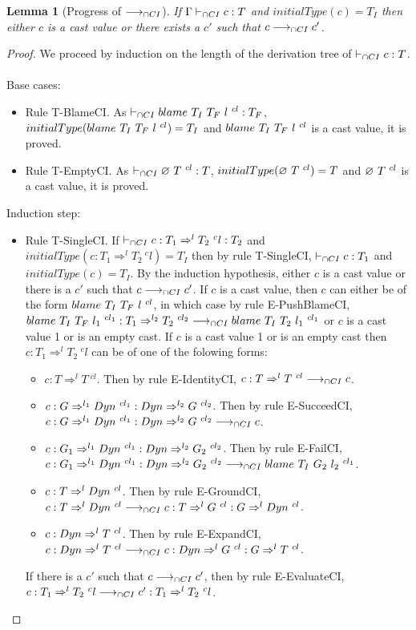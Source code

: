 \documentclass[a4paper]{article}
\newtheorem{lemma}{Lemma}[section]
\begin{document}
\begin{lemma}[Progress of $\longrightarrow_{\cap CI}$]
\label{progressIC}
If $\Gamma \vdash_{\cap CI} c : T$ and $initialType(c) = T_I$ then either $c$ is a cast value or there exists a $c'$ such that $c \longrightarrow_{\cap CI} c'$.
\end{lemma}
\begin{proof}
We proceed by induction on the length of the derivation tree of $\vdash_{\cap CI} c : T$.\\\\
Base cases:
\begin{itemize}
    \item Rule T-BlameCI.
    As $\vdash_{\cap CI} blame\ T_I\ T_F\ l\ ^{cl} : T_F$, $initialType(blame\ T_I\ T_F\ l\ ^{cl}) = T_I$ and $blame\ T_I\ T_F\ l\ ^{cl}$ is a cast value, it is proved.
    \item Rule T-EmptyCI.
    As $\vdash_{\cap CI} \varnothing\ T\ ^{cl} : T$, $initialType(\varnothing\ T\ ^{cl}) = T$ and $\varnothing\ T\ ^{cl}$ is a cast value, it is proved.
\end{itemize}
Induction step:
\begin{itemize}
    \item Rule T-SingleCI.
    If $\vdash_{\cap CI} c : T_1 \Rightarrow^l T_2\ ^cl : T_2$ and $initialType(c : T_1 \Rightarrow^l T_2\ ^cl) = T_I$ then by rule T-SingleCI, $\vdash_{\cap CI} c : T_1$ and $initialType(c) = T_I$.
    By the induction hypothesis, either $c$ is a cast value or there is a $c'$ such that $c \longrightarrow_{\cap CI} c'$.
    If $c$ is a cast value, then $c$ can either be of the form $blame\ T_I\ T_F\ l\ ^{cl}$, in which case by rule E-PushBlameCI, $blame\ T_I\ T_F\ l_1\ ^{cl_1} : T_1 \Rightarrow^{l_2} T_2\ ^{cl_2} \longrightarrow_{\cap CI} blame\ T_I\ T_2\ l_1\ ^{cl_1}$ or $c$ is a cast value 1 or is an empty cast.
    If $c$ is a cast value 1 or is an empty cast then $c : T_1 \Rightarrow^l T_2\ ^cl$ can be of one of the folowing forms:
    \begin{itemize}
        \item $c : T \Rightarrow^l T\ ^{cl}$. Then by rule E-IdentityCI, $c : T \Rightarrow^l T\ ^{cl} \longrightarrow_{\cap CI} c$.
        \item $c : G \Rightarrow^{l_1} Dyn\ ^{cl_1} : Dyn \Rightarrow^{l_2} G\ ^{cl_2}$. Then by rule E-SucceedCI, $c : G \Rightarrow^{l_1} Dyn\ ^{cl_1} : Dyn \Rightarrow^{l_2} G\ ^{cl_2} \longrightarrow_{\cap CI} c$.
        \item $c : G_1 \Rightarrow^{l_1} \Dyn\ ^{cl_1} : \Dyn \Rightarrow^{l_2} G_2\ ^{cl_2}$. Then by rule E-FailCI, $c : G_1 \Rightarrow^{l_1} \Dyn\ ^{cl_1} : \Dyn \Rightarrow^{l_2} G_2\ ^{cl_2} \cios \blamecast{T_I}{G_2}{l_2}{cl_1}$.
        \item $c : T \Rightarrow^l \Dyn\ ^{cl}$. Then by rule E-GroundCI, $c : T \Rightarrow^l Dyn\ ^{cl} \longrightarrow_{\cap CI} c : T \Rightarrow^l G\ ^{cl} : G \Rightarrow^l Dyn\ ^{cl}$.
        \item $c : \Dyn \Rightarrow^l T\ ^{cl}$. Then by rule E-ExpandCI, $c : Dyn \Rightarrow^l T\ ^{cl} \longrightarrow_{\cap CI} c : Dyn \Rightarrow^l G\ ^{cl} : G \Rightarrow^l T\ ^{cl}$.
    \end{itemize}
    If there is a $c'$ such that $c \longrightarrow_{\cap CI} c'$, then by rule E-EvaluateCI, $c : T_1 \Rightarrow^l T_2\ ^cl \longrightarrow_{\cap CI} c' : T_1 \Rightarrow^l T_2\ ^cl$.
\end{itemize}
\end{proof}
\end{document}

